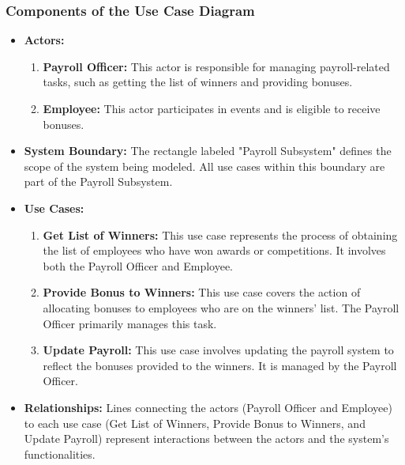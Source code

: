 \subsubsection{Components of the Use Case Diagram }
\begin{itemize}
    \item \textbf{Actors: }
    \begin{enumerate}
        \item \textbf{Payroll Officer: }This actor is responsible for managing payroll-related tasks, such as getting the list of winners and providing bonuses.  
        \item \textbf{Employee: }This actor participates in events and is eligible to receive bonuses.  
    \end{enumerate}
    \item \textbf{System Boundary: }The rectangle labeled "Payroll Subsystem" defines the scope of the system being modeled. All use cases within this boundary are part of the Payroll Subsystem. 
    \item \textbf{Use Cases: }
    \begin{enumerate}
        \item \textbf{Get List of Winners: }This use case represents the process of obtaining the list of employees who have won awards or competitions. It involves both the Payroll Officer and Employee.  
        \item \textbf{Provide Bonus to Winners: }This use case covers the action of allocating bonuses to employees who are on the winners' list. The Payroll Officer primarily manages this task.   
        \item \textbf{Update Payroll: } This use case involves updating the payroll system to reflect the bonuses provided to the winners. It is managed by the Payroll Officer.  
    \end{enumerate}
    \item \textbf{Relationships: } Lines connecting the actors (Payroll Officer and Employee) to each use case (Get List of Winners, Provide Bonus to Winners, and Update Payroll) represent interactions between the actors and the system's functionalities.  
\end{itemize}

